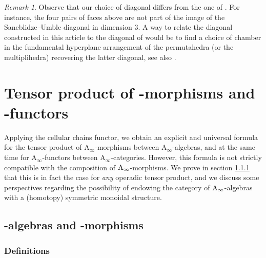 \documentclass[twoside, 12pt]{amsart}
\theoremstyle{remark}
\newtheorem{remark}[definition]{\sc Remark}
\begin{document}

\begin{remark}
Observe that our choice of diagonal differs from the one of \cite{SaneblidzeUmble04}. 
For instance, the four pairs of faces above are not part of the image of the Saneblidze--Umble diagonal in dimension $3$. 
A way to relate the diagonal constructed in this article to the diagonal of \cite{SaneblidzeUmble04} would be to find a choice of chamber in the fundamental hyperplane arrangement of the permutahedra (or the multiplihedra) recovering the latter diagonal, see also \cite[Remark~3.18]{LA21}.
\end{remark}


\section{Tensor product of \Ainf -morphisms and \Ainf -functors}
\label{sec:IV}


Applying the cellular chains functor, we obtain an explicit and universal formula for the tensor product of $\mathrm{A}_\infty$-morphisms between $\mathrm{A}_\infty$-algebras, and at the same time for $\mathrm{A}_\infty$-functors between $\mathrm{A}_\infty$-categories. 
However, this formula is not strictly compatible with the composition of $\mathrm{A}_\infty$-morphisms. 
We prove in section \ref{} that this is in fact the case for \emph{any} operadic tensor product, and we discuss some perspectives regarding the possibility of endowing the category of $\mathrm{A}_\infty$-algebras with a (homotopy) symmetric monoidal structure. 

\subsection{\Ainf -algebras and \Ainf -morphisms}

\subsubsection{Definitions}
\end{document}
